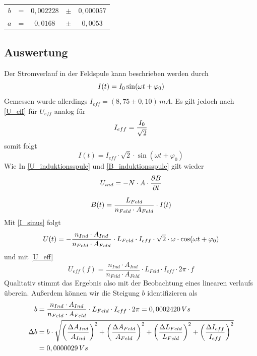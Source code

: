 \documentclass{article}
\begin{document}
\begin{center}
\begin{tabular}{c c c c c} 
  \(b\) & = & \(0,002228\) & \(\pm \) & \(0,000057 \) \\ 
  \(a\) & = & \(0,0168\) & \(\pm \) & \(0,0053 \) \\ 

 \end{tabular}
\end{center}

\subsection{Auswertung}
Der Stromverlauf in der Feldspule kann beschrieben werden durch
\begin{equation}
I(t) = I_0 \sin(\omega t + \varphi_0)
\notag
\end{equation}
Gemessen wurde allerdings \( I_{eff} = (8,75 \pm 0,10)\,mA \). Es gilt jedoch nach \eqref{U_eff} für \( U_{eff} \) analog für
\begin{equation}
I_{eff} = \frac{I_0}{\sqrt{2}}
\notag
\end{equation}
somit folgt
\begin{equation}
I(t) = I_{eff} \cdot \sqrt{2} \cdot \sin(\omega t + \varphi_0)
\label{I_sinus}
\end{equation}
Wie In \eqref{U_induktionsspule} und \eqref{B_induktionsspule} gilt wieder
\begin{equation}
U_{ind} = -N \cdot A \cdot \frac{\partial B}{\partial t}
\notag
\end{equation}

\begin{equation}
B(t) = \frac{L_{Feld}}{n_{Feld} \cdot A_{Feld}} \cdot I(t)
\notag
\end{equation}
Mit \eqref{I_sinus} folgt
\begin{equation}
U(t) = -\frac{n_{Ind} \cdot A_{Ind}}{n_{Feld} \cdot A_{Feld}} \cdot L_{Feld} \cdot I_{eff} \cdot \sqrt{2} \cdot \omega \cdot \cos(\omega t + \varphi_0)
\notag
\end{equation}
und mit \eqref{U_eff}
\begin{equation}
U_{eff}(f) = \frac{n_{Ind} \cdot A_{Ind}}{n_{Feld} \cdot A_{Feld}} \cdot L_{Feld} \cdot I_{eff} \cdot 2\pi \cdot f
\label{U_eff(t)}
\end{equation}
Qualitativ stimmt das Ergebnis also mit der Beobachtung eines linearen verlaufs überein. Außerdem können wir die Steigung \(b\) identifizieren als
\begin{align}
b &= \frac{n_{Ind} \cdot A_{Ind}}{n_{Feld} \cdot A_{Feld}} \cdot L_{Feld} \cdot I_{eff} \cdot 2\pi
= 0,0002420 \,Vs
\notag
\\
\Delta b &= b \cdot \sqrt{
\left( \frac{\Delta A_{Ind}}{A_{Ind}} \right)^2 +
\left( \frac{\Delta A_{Feld}}{A_{Feld}} \right)^2 +
\left( \frac{\Delta L_{Feld}}{L_{Feld}} \right)^2 +
\left( \frac{\Delta I_{eff}}{I_{eff}} \right)^2
}
\notag
\\
&= 0,0000029 \, Vs
\notag
\end{align} 
\end{document}
